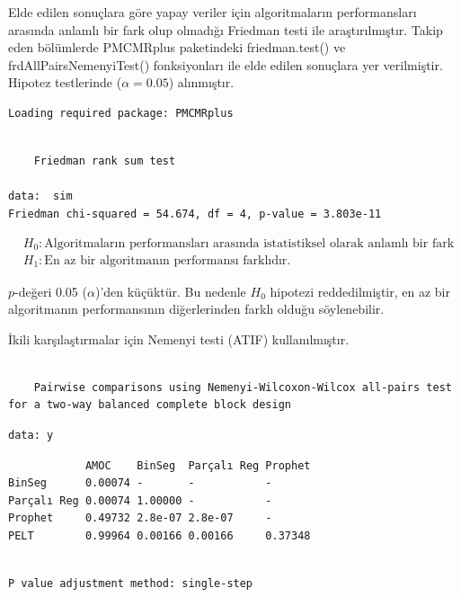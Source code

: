 \documentclass[12pt,twoside]{deuthesis}
\begin{document}
Elde edilen sonuçlara göre yapay veriler için algoritmaların performansları arasında anlamlı bir fark olup olmadığı Friedman testi ile araştırılmıştır. Takip eden bölümlerde PMCMRplus paketindeki friedman.test() ve frdAllPairsNemenyiTest() fonksiyonları ile elde edilen sonuçlara yer verilmiştir. Hipotez testlerinde (\(\alpha=0.05\)) alınmıştır.

\begin{verbatim}
Loading required package: PMCMRplus
\end{verbatim}

\begin{verbatim}

    Friedman rank sum test

data:  sim
Friedman chi-squared = 54.674, df = 4, p-value = 3.803e-11
\end{verbatim}

\begin{align*}
&H_0:\text{Algoritmaların performansları arasında istatistiksel olarak anlamlı bir fark yoktur.} \\
&H_1:\text{En az bir algoritmanın performansı farklıdır.}
\end{align*}

\(p\)-değeri 0.05 (\(\alpha\))'den küçüktür. Bu nedenle \(H_0\) hipotezi reddedilmiştir, en az bir algoritmanın performansının diğerlerinden farklı olduğu söylenebilir.

İkili karşılaştırmalar için Nemenyi testi (ATIF) kullanılmıştır.

\begin{verbatim}

    Pairwise comparisons using Nemenyi-Wilcoxon-Wilcox all-pairs test for a two-way balanced complete block design
\end{verbatim}

\begin{verbatim}
data: y
\end{verbatim}

\begin{verbatim}
            AMOC    BinSeg  Parçalı Reg Prophet
BinSeg      0.00074 -       -           -      
Parçalı Reg 0.00074 1.00000 -           -      
Prophet     0.49732 2.8e-07 2.8e-07     -      
PELT        0.99964 0.00166 0.00166     0.37348
\end{verbatim}

\begin{verbatim}

P value adjustment method: single-step
\end{verbatim}
\end{document}
